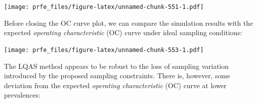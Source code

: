 \documentclass[12pt,a4paper]{book}
\newenvironment{Shaded}{\begin{snugshade}}{\end{snugshade}}
\newcommand{\DataTypeTok}[1]{\textcolor[rgb]{0.13,0.29,0.53}{#1}}
\newcommand{\DecValTok}[1]{\textcolor[rgb]{0.00,0.00,0.81}{#1}}
\newcommand{\FloatTok}[1]{\textcolor[rgb]{0.00,0.00,0.81}{#1}}
\newcommand{\KeywordTok}[1]{\textcolor[rgb]{0.13,0.29,0.53}{\textbf{#1}}}
\newcommand{\NormalTok}[1]{#1}
\newcommand{\OperatorTok}[1]{\textcolor[rgb]{0.81,0.36,0.00}{\textbf{#1}}}
\newcommand{\OtherTok}[1]{\textcolor[rgb]{0.56,0.35,0.01}{#1}}
\newcommand{\StringTok}[1]{\textcolor[rgb]{0.31,0.60,0.02}{#1}}
\theoremstyle{definition}
\theoremstyle{definition}
\theoremstyle{definition}
\theoremstyle{remark}
\begin{document}
\texttt{[image: prfe\_files/figure-latex/unnamed-chunk-551-1.pdf]}

Before closing the OC curve plot, we can compare the simulation results
with the expected \emph{operating characteristic} (OC) curve under ideal
sampling conditions:

\begin{Shaded}
\end{Shaded}

\texttt{[image: prfe\_files/figure-latex/unnamed-chunk-553-1.pdf]}

The LQAS method appears to be robust to the loss of sampling variation
introduced by the proposed sampling constraints. There is, however, some
deviation from the expected \emph{operating characteristic} (OC) curve
at lower prevalences:

\begin{Shaded}
\end{Shaded}
\end{document}

